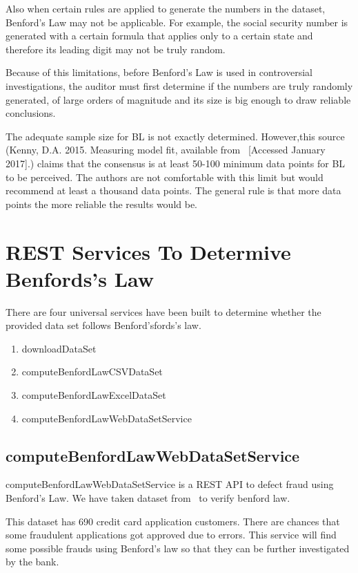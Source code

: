Also when certain rules are applied to generate 
the numbers in the dataset, Benford’s Law may not be applicable.
For example, the social security number is generated with a 
certain formula that applies only to a certain state 
and therefore its leading digit may not be truly random. 

Because of this limitations, before Benford’s Law is
used in controversial investigations, the auditor must 
first determine if the numbers are truly randomly generated, 
of large orders of magnitude and its size is big enough 
to draw reliable conclusions.

The adequate sample size for BL is not exactly 
determined. However,this source 
(Kenny, D.A. 2015. Measuring model fit, 
available from~\cite{hid-sp18-514-Kenny-Measuring-model}
[Accessed January 2017].)  
claims that the consensus is at least 50-100 minimum data 
points for BL to be perceived. The authors are not 
comfortable with this limit but would recommend at least 
a thousand data points. The general rule is that more 
data points the more reliable the results would be.

\section{REST Services To Determive Benfords's Law}

There are four universal services have been built to determine
whether the provided data set follows Benford’sfords's law.

\begin{enumerate}
 \item downloadDataSet
 \item computeBenfordLawCSVDataSet
 \item computeBenfordLawExcelDataSet
 \item computeBenfordLawWebDataSetService
\end{enumerate}

\subsection{computeBenfordLawWebDataSetService}
computeBenfordLawWebDataSetService is 
a REST API to defect fraud using Benford's Law.
We have taken dataset from~\cite{hid-sp18-514-aust-cc-benford}
to verify benford law.

This dataset has 690 credit card application customers.
There are chances that some fraudulent applications 
got approved due to errors. 
This service will find some possible frauds using 
Benford's law so that they can be further 
investigated by the bank.

